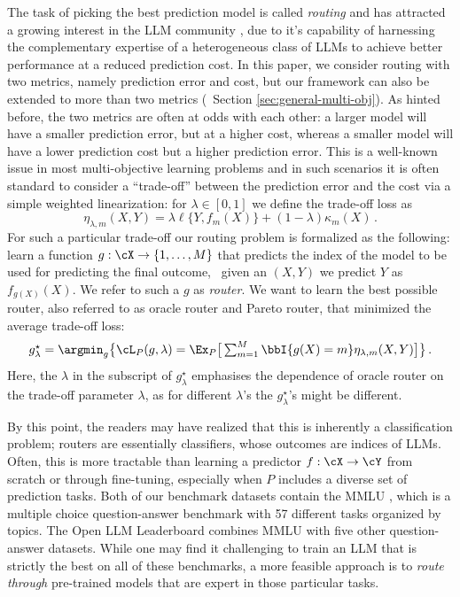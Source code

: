 The task of picking the best prediction model is called \emph{routing} and has attracted a growing interest in the LLM community \citep{lu2023routing,wang2023fusing}, due to it's capability of harnessing the complementary expertise of a heterogeneous class of LLMs to achieve better performance at a reduced prediction cost. 
In this paper, we consider routing with two metrics, namely prediction error and cost, but our framework can also be extended to more than two metrics (\cf\ Section \ref{sec:general-multi-obj}). As hinted before, the two metrics are often at odds with each other: a larger model will have a smaller prediction error, but at a higher cost, whereas a smaller model will have a lower prediction cost but a higher prediction error. This is a well-known issue in most multi-objective learning problems and in such scenarios it is often standard to consider a ``trade-off'' between the prediction error and the cost via a simple weighted linearization: for $\lambda \in [0,1 ]$ we define the trade-off loss as 
\begin{equation} \label{eq:linearized-loss}
  \eta_{\lambda, m}(X, Y) =  \lambda \ell\{Y, f_m(X)\} + (1 - \lambda) \kappa_m(X)  \,.
\end{equation}
For such a particular trade-off our routing problem is formalized as the following: learn a function $g: \cX\to \{1, \dots, M\}$ 
that predicts the index of the model to be used for predicting the final outcome, \ie\ given an $(X, Y)$ we predict $Y$ as $f_{g(X)}(X)$. We refer to such a $g$ as \emph{router}. We want to learn the best possible router, also referred to as oracle router and Pareto router, that  
minimized the average trade-off loss: 
\begin{equation} \label{eq:risk-trade-off}
  \textstyle g_\lambda^\star =   \argmin_g \big \{ \cL_P(g, \lambda) =  \Ex_P \big[\sum_{m = 1}^M \bbI \{ g(X) = m\} \eta_{\lambda, m}(X, Y) \big]\big \} \,.
\end{equation} Here, the $\lambda$ in the subscript of  $g_\lambda^\star$ emphasises the dependence of oracle router on the trade-off parameter $\lambda$, as for different $\lambda$'s the  $g_\lambda^\star$'s might be different. 

By this point, the readers may have realized that this is inherently a classification problem; routers are essentially classifiers, whose outcomes are indices of LLMs. Often, this is more tractable than learning a predictor $f:\cX \to \cY$ from scratch or through fine-tuning, especially when $P$ includes a diverse set of prediction tasks. 
Both of our benchmark datasets contain the
MMLU \citep{hendrycks2020measuring},
which is a multiple choice question-answer benchmark with 57 different tasks organized by topics. The Open LLM Leaderboard \citep{open-llm-leaderboard-v2} combines MMLU with five other question-answer datasets. While one may find it challenging to train an LLM that is strictly the best on all of these benchmarks, a more feasible approach is to \emph{route through} pre-trained models that are expert in those particular tasks.


